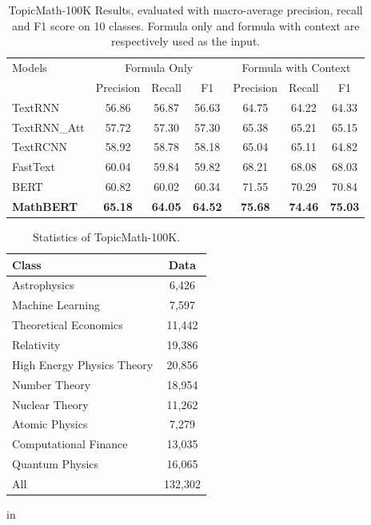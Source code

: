 \documentclass{article}
\begin{document}
\begin{table*}[!tbp]
\begin{center}
\begin{tabular}{lcccccc}
\toprule
\multirow{2}{*}{Models}              & \multicolumn{3}{c}{Formula Only} & \multicolumn{3}{c}{Formula   with Context} \\
        & Precision    & Recall   & F1       & Precision      & Recall      & F1          \\
\hline            
TextRNN    & 56.86       & 56.87   & 56.63   & 64.75         & 64.22      & 64.33      \\
TextRNN\_Att      & 57.72       & 57.30   & 57.30   & 65.38         & 65.21      & 65.15      \\
TextRCNN          & 58.92       & 58.78   & 58.18   & 65.04         & 65.11      & 64.82      \\
FastText        & 60.04       & 59.84   & 59.82   & 68.21         & 68.08      & 68.03      \\
\hline
BERT            & 60.82       & 60.02   & 60.34   & 71.55         & 70.29      & 70.84      \\
\textbf{MathBERT}          & \textbf{65.18}       & \textbf{64.05}   & \textbf{64.52}   & \textbf{75.68}         & \textbf{74.46}      & \textbf{75.03}     \\
\bottomrule
\end{tabular}
\end{center}
\vskip -0.1in
\caption{TopicMath-100K Results, evaluated with macro-average precision, recall and F1 score on 10 classes. Formula only and formula with context are respectively used as the input.}
\label{tab:classification}
\vskip -0.1in
\end{table*}

\begin{table}[!t]
\begin{center}
\begin{tabular}{lc}
\toprule
Class & Data   \\
\midrule
Astrophysics & 6,426 \\
Machine Learning & 7,597 \\
Theoretical Economics & 11,442 \\
Relativity & 19,386 \\
High Energy Physics Theory & 20,856 \\
Number Theory & 18,954 \\
Nuclear Theory & 11,262 \\
Atomic Physics & 7,279 \\
Computational Finance & 13,035 \\
Quantum Physics & 16,065 \\
All      & 132,302 \\
\bottomrule
\end{tabular}
\end{center}
\vskip -0.1in
\caption{Statistics of TopicMath-100K.}
\label{tab:TopicMathData}
 in
\end{table}
\end{document}
